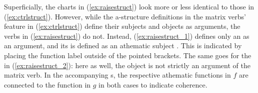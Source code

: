 Superficially, the charts in (\ref{ex:raisestruct}) look more or less identical
to those in (\ref{ex:ctrlstruct}). However, while the a-structure definitions
in the matrix verbs' \Pred{} feature in (\ref{ex:ctrlstruct}) define their
subjects and objects as arguments, the verbs in (\ref{ex:raisestruct}) do not.
Instead, (\ref{ex:raisestruct_1}) defines only an \XCompl{} as an argument, and
its \Subj{} is defined as an athematic subject \citep[304--308]{bresnan2016}.
This is indicated by placing the function label outside of the pointed
brackets. The same goes for the \Obj{} in (\ref{ex:raisestruct_2}): here as
well, the object is not strictly an argument of the matrix verb. In the
accompanying \Avm{}s, the respective athematic functions in $f$ are connected
to the \Subj{} function in $g$ in both cases to indicate coherence.

